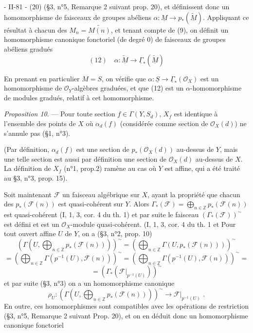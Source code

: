 \newpage


- II-81 - \hfill (20)
(\S 3, n°5, Remarque 2 suivant prop. 20), et définissent donc un homomorphisme de faisceaux de groupes abéliens
$\alpha : \underline{M} \to p_*(\underline{\widetilde{M}})$. Appliquant ce résultat à chacun des $M_n = \widetilde{M(n)}$, et tenant compte de (9), on définit un homomorphisme canonique fonctoriel (de degré 0) de faisceaux de groupes abéliens gradués
$$(12) \quad \alpha : \underline{\widetilde{M}} \to \underline{\Gamma}_*(\underline{\widetilde{M}})$$

En prenant en particulier $M = S$, on vérifie que $\alpha : \underline{S} \to \underline{\Gamma}_*(\mathcal{O}_X)$ est un homomorphisme de $\mathcal{O}_Y$-algèbres graduées, et que (12) est un $\alpha$-homomorphisme de modules gradués, relatif à cet homomorphisme.

\emph{Proposition 10}. — Pour toute section $f \in \Gamma(Y, S_d)$, $X_f$ est identique à l'ensemble des points de $X$ où $\alpha_d(f)$ (considérée comme section de $\mathcal{O}_X(d)$) ne s'annule pas (\S 1, n°3).

(Par définition, $\alpha_d(f)$ est une section de $p_*(\mathcal{O}_X(d))$ au-dessus de $Y$, mais une telle section est aussi par définition une section de $\mathcal{O}_X(d)$ au-dessus de $X$. La définition de $X_f$ (n°1, prop.2) ramène au cas où $Y$ est affine, qui a été traité au \S 3, n°3, prop. 15).

Soit maintenant $\mathcal{F}$ un faisceau algébrique sur $X$, ayant la propriété que chacun des $p_*(\mathcal{F}(n))$ est quasi-cohérent sur $Y$. Alors $\Gamma_*(\mathcal{F}) = \bigoplus_{n \in \mathbb{Z}} p_*(\mathcal{F}(n))$ est quasi-cohérent (I, 1, 3, cor. 4 du th. 1) et par suite le faisceau $(\Gamma_*(\mathcal{F}))^{\sim}$ est défini et est un $\mathcal{O}_X$-module quasi-cohérent.
(I, 1, 3, cor. 4 du th. 1 et Pour tout ouvert affine $U$ de $Y$, on a (\S 3, n°2, prop. 10)
$$(\Gamma(U, \bigoplus_{n \in \mathbb{Z}} p_*(\mathcal{F}(n))))^{\sim} = (\bigoplus_{n \in \mathbb{Z}} \Gamma(U, p_*(\mathcal{F}(n))))^{\sim}$$
$$= (\bigoplus_{n \in \mathbb{Z}} \Gamma(p^{-1}(U), \mathcal{F}(n)))^{\sim} = (\bigoplus_{n \in \mathbb{Z}} \Gamma(p^{-1}(U), \mathcal{F}(n)))^{\sim} =$$
$$= (\Gamma_*( \mathcal{F}|_{p^{-1}(U)} ))^{\sim}$$
et par suite (\S 3, n°3) on a un homomorphisme canonique
$$\rho_U : (\Gamma(U, \bigoplus_{n \in \mathbb{Z}} p_*(\mathcal{F}(n))))^{\sim} \to \mathcal{F}|_{p^{-1}(U)} \text{ .}$$
En outre, ces homomorphismes sont compatibles avec les opérations de restriction (\S 3, n°5, Remarque 2 suivant Prop. 20), et on en déduit donc un homomorphisme canonique fonctoriel

